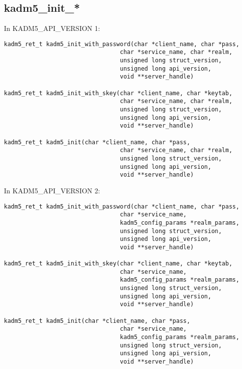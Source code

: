 \subsection{kadm5_init_*}

In KADM5_API_VERSION 1:

\begin{verbatim}
kadm5_ret_t kadm5_init_with_password(char *client_name, char *pass,
                                 char *service_name, char *realm,
                                 unsigned long struct_version,
                                 unsigned long api_version,
                                 void **server_handle)

kadm5_ret_t kadm5_init_with_skey(char *client_name, char *keytab,
                                 char *service_name, char *realm,
                                 unsigned long struct_version,
                                 unsigned long api_version,
                                 void **server_handle)

kadm5_ret_t kadm5_init(char *client_name, char *pass,
                                 char *service_name, char *realm,
                                 unsigned long struct_version,
                                 unsigned long api_version,
                                 void **server_handle)
\end{verbatim}

In KADM5_API_VERSION 2:

\begin{verbatim}
kadm5_ret_t kadm5_init_with_password(char *client_name, char *pass,
                                 char *service_name,
                                 kadm5_config_params *realm_params,
                                 unsigned long struct_version,
                                 unsigned long api_version,
                                 void **server_handle)

kadm5_ret_t kadm5_init_with_skey(char *client_name, char *keytab,
                                 char *service_name,
                                 kadm5_config_params *realm_params,
                                 unsigned long struct_version,
                                 unsigned long api_version,
                                 void **server_handle)

kadm5_ret_t kadm5_init(char *client_name, char *pass,
                                 char *service_name,
                                 kadm5_config_params *realm_params,
                                 unsigned long struct_version,
                                 unsigned long api_version,
                                 void **server_handle)
\end{verbatim}

